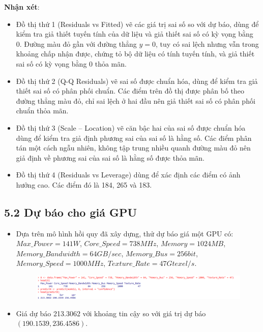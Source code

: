 \documentclass[a4paper]{article}
\begin{document}
            \fontsize{13pt}{15pt}\selectfont \textbf{Nhận xét}: \begin{itemize}[leftmargin=3.5em, itemsep=-1.5em, parsep=1.6em]
                \vspace{-6pt}
                \item \fontsize{13pt}{15pt}\selectfont Đồ thị thứ 1 (Residuals vs Fitted) vẽ các giá trị sai số so với dự báo, dùng để kiểm tra giả thiết tuyến tính của dữ liệu và giả thiết sai số có kỳ vọng bằng 0. Đường màu đỏ gần với đường thẳng $y = 0$, tuy có sai lệch nhưng vẫn trong khoảng chấp nhận được, chứng tỏ bộ dữ liệu có tính tuyến tính, và giả thiết sai số có kỳ vọng bằng 0 thỏa mãn.
                \item \fontsize{13pt}{15pt}\selectfont Đồ thị thứ 2 (Q-Q Residuals) vẽ sai số được chuẩn hóa, dùng để kiểm tra giả thiết sai số có phân phối chuẩn. Các điểm trên đồ thị được phân bố theo đường thẳng màu đỏ, chỉ sai lệch ở hai đầu nên giả thiết sai số có phân phối chuẩn thỏa mãn.
                \item \fontsize{13pt}{15pt}\selectfont Đồ thị thứ 3 (Scale – Location) vẽ căn bậc hai của sai số được chuẩn hóa dùng để kiểm tra giả định phương sai của sai số là hằng số. Các điểm phân tán một cách ngẫu nhiên, không tập trung nhiều quanh đường màu đỏ nên giả định về phương sai của sai số là hằng số được thỏa mãn.
                \item \fontsize{13pt}{15pt}\selectfont Đồ thị thứ 4 (Residuals vs Leverage) dùng để xác định các điểm có ảnh hưởng cao. Các điểm đó là 184, 265 và 183.
            \end{itemize}

\newpage
        \subsection*{5.2 Dự báo cho giá GPU}
            \begin{itemize}
                \vspace{-6pt}
                \item \fontsize{13pt}{15pt}\selectfont Dựa trên mô hình hồi quy đã xây dựng, thử dự báo giá một GPU có: $Max\_Power = 141W$, $Core\_Speed = 738MHz$, $Memory = 1024MB$, $Memory\_Bandwidth = 64GB/sec$, $Memory\_Bus = 256bit$, $Memory\_Speed = 1000MHz$, $Texture\_Rate = 47Gtexel/s$.
                \begin{figure}[H]
                    \centering
                    \includegraphics[width=0.9\linewidth]{4. GPU/Thống kê suy diễn/Dự báo giá.png}
                \end{figure}
                \item \fontsize{13pt}{15pt}\selectfont Giá dự báo 213.3062 với khoảng tin cậy so với giá trị dự báo $(190.1539, 236.4586)$.
            \end{itemize}
\end{document}
